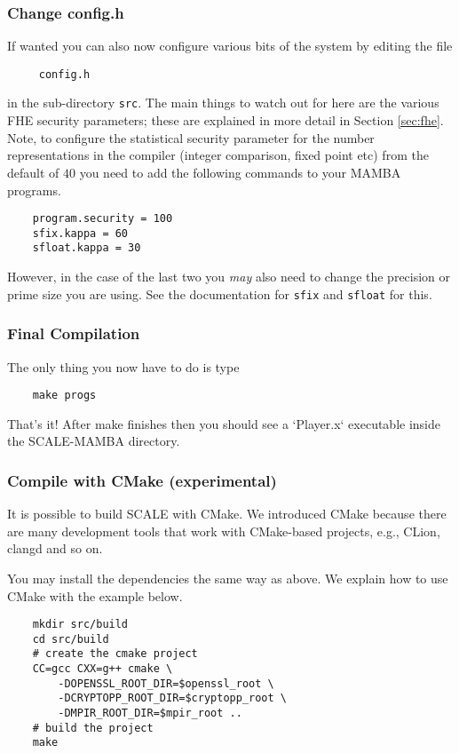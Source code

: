 \subsubsection{Change config.h}
If wanted you can also now configure various bits of the system
by editing the file
\begin{verbatim}
     config.h
\end{verbatim}
in the sub-directory \verb+src+.
The main things to watch out for here are the various FHE security parameters;
these are explained in more detail in Section \ref{sec:fhe}.
Note, to configure the statistical security parameter for the number representations
in the compiler (integer comparison, fixed point etc) from the default
of $40$ you need to add the following commands to your MAMBA programs.
\begin{verbatim}
    program.security = 100
    sfix.kappa = 60
    sfloat.kappa = 30
\end{verbatim}
However, in the case of the last two you {\em may} also need to change the
precision or prime size you are using. See the documentation for
\verb+sfix+ and \verb+sfloat+ for this.

\subsubsection{Final Compilation}
The only thing you now have to do is type
\begin{verbatim}
    make progs
\end{verbatim}
That's it! After make finishes then you should see a `Player.x`
executable inside the SCALE-MAMBA directory.

\subsubsection{Compile with CMake (experimental)}
It is possible to build SCALE with CMake.
We introduced CMake because there are many development tools that work with CMake-based projects,
e.g., CLion, clangd and so on.

You may install the dependencies the same way as above.
We explain how to use CMake with the example below.

\begin{verbatim}
    mkdir src/build
    cd src/build
    # create the cmake project
    CC=gcc CXX=g++ cmake \
        -DOPENSSL_ROOT_DIR=$openssl_root \
        -DCRYPTOPP_ROOT_DIR=$cryptopp_root \
        -DMPIR_ROOT_DIR=$mpir_root ..
    # build the project
    make
\end{verbatim}

